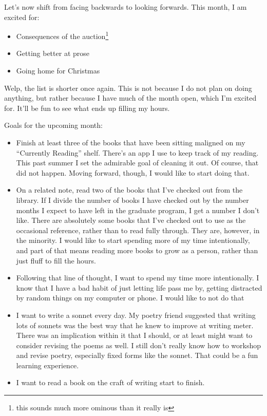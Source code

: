 \documentclass[12pt]{article}[titlepage]
\newcommand{\say}[1]{``#1''}
\renewcommand{\,}{\textsuperscript{,}}
\begin{document}
Let's now shift from facing backwards to looking forwards.
This month, I am excited for:
\begin{itemize}
\item Consequences of the auction\footnote{this sounds much more ominous than it really is}
\item Getting better at prose
\item Going home for Christmas
\end{itemize}
 
Welp, the list is shorter once again.
This is not because I do not plan on doing anything, but rather because I have much of the month open, which I'm excited for.
It'll be fun to see what ends up filling my hours.
 
Goals for the upcoming month:
\begin{itemize}
\item Finish at least three of the books that have been sitting maligned on my \say{Currently Reading} shelf.
There's an app I use to keep track of my reading.
This past summer I set the admirable goal of cleaning it out.
Of course, that did not happen.
Moving forward, though, I would like to start doing that.
\item On a related note, read two of the books that I've checked out from the library.
If I divide the number of books I have checked out by the number months I expect to have left in the graduate program, I get a number I don't like.
There are absolutely some books that I've checked out to use as the occasional reference, rather than to read fully through.
They are, however, in the minority.
I would like to start spending more of my time intentionally, and part of that means reading more books to grow as a person, rather than just fluff to fill the hours.
\item Following that line of thought, I want to spend my time more intentionally. I know that I have a bad habit of just letting life pass me by, getting distracted by random things on my computer or phone.
I would like to not do that  
\item I want to write a sonnet every day.
My poetry friend suggested that writing lots of sonnets was the best way that he knew to improve at writing meter.
There was an implication within it that I should, or at least might want to consider revising the poems as well.
I still don't really know how to workshop and revise poetry, especially fixed forms like the sonnet.
That could be a fun learning experience.
\item I want to read a book on the craft of writing start to finish.

\end{itemize}
\end{document}
